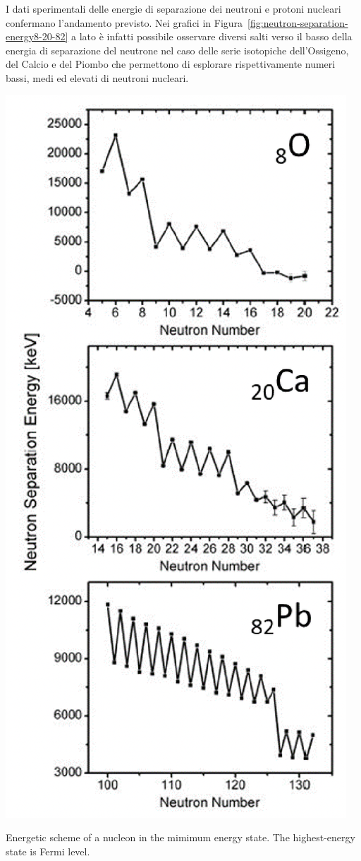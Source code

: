 I dati sperimentali delle energie di separazione dei neutroni e protoni nucleari confermano l’andamento previsto.
Nei grafici in Figura~\ref{fig:neutron-separation-energy8-20-82} a lato è infatti possibile osservare diversi salti verso il basso della energia di
separazione del neutrone nel caso delle serie isotopiche dell’Ossigeno, del Calcio e del Piombo che permettono di esplorare
rispettivamente numeri bassi, medi ed elevati di neutroni nucleari.
\begin{marginfigure}
	\includegraphics{figs/neutron-separation-energy8-20-82}
	\caption{Energetic scheme of a nucleon in the mimimum energy state. The highest-energy state is Fermi level.}
	\label{fig:neutron-separation-energy8-20-82}
\end{marginfigure}
